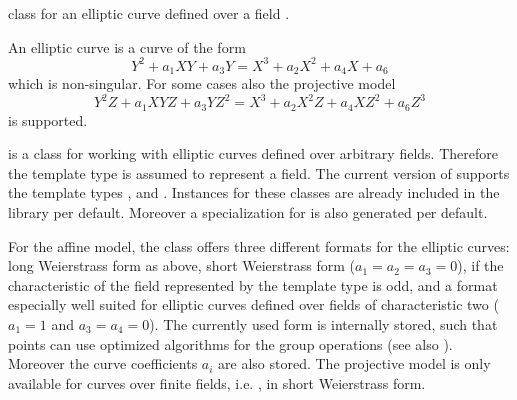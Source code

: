 

\NAME

 \dotfill class for an elliptic curve defined over a field .



\ABSTRACT

An elliptic curve is a curve of the form
\begin{displaymath}
  Y^2 + a_1 X Y + a_3 Y = X^3 + a_2 X^2 + a_4 X + a_6
\end{displaymath}
which is non-singular.  For some cases also the projective model
\begin{displaymath}
  Y^2 Z + a_1 X Y Z + a_3 Y Z^2 = X^3 + a_2 X^2 Z + a_4 X Z^2 + a_6 Z^3
\end{displaymath}
is supported.



\DESCRIPTION

 is a class for working with elliptic curves defined over arbitrary
fields.  Therefore the template type  is assumed to represent a field.  The current
version of  supports the template types , and
.  Instances for these classes are already included in the \LiDIA library per
default.  Moreover a specialization for  is also generated per
default.

For the affine model, the class offers three different formats for the elliptic curves: long
Weierstrass form as above, short Weierstrass form ($a_1 = a_2 = a_3 = 0$), if the characteristic
of the field represented by the template type  is odd, and a format especially well
suited for elliptic curves defined over fields of characteristic two ($a_1 = 1$ and $a_3 = a_4 =
0$).  The currently used form is internally stored, such that points can use optimized
algorithms for the group operations (see also ).  Moreover the curve
coefficients $a_i$ are also stored.  The projective model is only available for curves over
finite fields, i.e.  , in short Weierstrass form.

